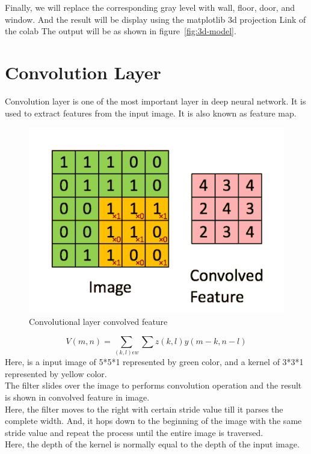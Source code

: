             \break 
            Finally, we will replace the corresponding gray level with wall, floor, door, and window.  And the result will be display using the matplotlib 3d projection  Link of the colab  The output will be as shown in figure~\ref{fig:3d-model}.  
        
        \section{Convolution Layer}
            Convolution layer is one of the most important layer in deep neural network. It is used to extract features from the input image. It is also known as feature map.

            \begin{figure}[h]                 
                \centering                 
                \includegraphics[width=.5\textwidth]{img/experiment/convolution.png}                 
                \caption{Convolutional layer convolved feature}                 
                \label{fig:Convolutional layer convolved feature}         
            \end{figure}
            \begin{equation}
                V(m,n) = \sum_{(k,l)\epsilon w}\sum z(k,l)y(m-k,n-l)
            \end{equation}
            Here, is a input image of 5*5*1 represented by green color, and a kernel of 3*3*1 represented by yellow color.\\ 
            The filter slides over the image to performs convolution operation and the result is shown in convolved feature in image.\\
            Here, the filter moves to the right with certain stride value till it parses the complete width. And, it hops down to the beginning of the image with the same stride value and repeat the process until the entire image is traversed.\\
            Here, the depth of the kernel is normally equal to the depth of the input image.
